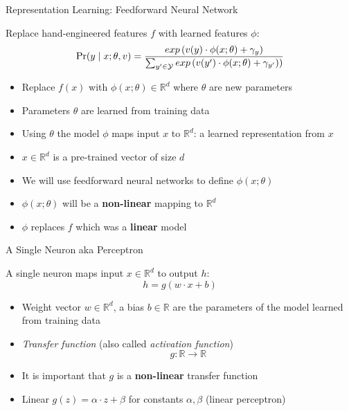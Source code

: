 \begin{frame}{Representation Learning: Feedforward Neural Network}
\begin{block}{Replace hand-engineered features $f$ with learned features $\phi$:}
\[ \Pr(y \mid x; \theta, v) = \frac{exp\left(v(y) \cdot \phi(x;\theta) + \gamma_y \right)}{\sum_{y' \in {\cal Y}} exp\left(v(y') \cdot \phi(x;\theta) + \gamma_{y'})\right)} \]
\end{block}

\begin{itemize}[<+->]
\item Replace $f(x)$ with $\phi(x;\theta) \in \mathbb{R}^d$ where $\theta$ are new parameters
\item Parameters $\theta$ are learned from training data
\item Using $\theta$ the model $\phi$ maps input $x$ to $\mathbb{R}^d$: a learned representation from $x$
\item $x \in \mathbb{R}^d$ is a pre-trained vector of size $d$
\item We will use feedforward neural networks to define $\phi(x;\theta)$
\item $\phi(x;\theta)$ will be a \textbf{non-linear} mapping to $\mathbb{R}^d$ 
\item $\phi$ replaces $f$ which was a \textbf{linear} model
\end{itemize}
\end{frame}

\begin{frame}{A Single Neuron aka Perceptron}
\begin{block}{A single neuron maps input $x \in \mathbb{R}^d$ to output $h$:}
\[ h = g(w \cdot x + b) \]
\end{block}
\begin{itemize}[<+->]
\item Weight vector $w \in \mathbb{R}^d$, a bias $b \in \mathbb{R}$ are the parameters of the model learned from training data
\item \textit{Transfer function} (also called \textit{activation function}) 
\[ g : \mathbb{R} \rightarrow \mathbb{R} \]
\item It is important that $g$ is a \textbf{non-linear} transfer function
\item Linear $g(z) = \alpha \cdot z + \beta$ for constants $\alpha, \beta$ \pause (linear perceptron)
\end{itemize}
\end{frame}

